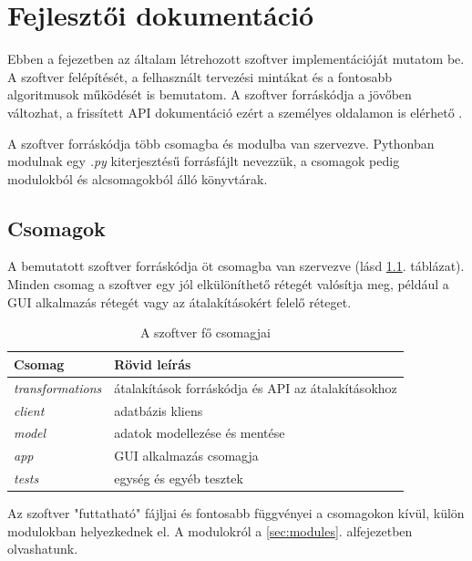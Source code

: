 \chapter{Fejlesztői dokumentáció}
\label{ch:impl}

Ebben a fejezetben az általam létrehozott szoftver implementációját mutatom be.
A szoftver felépítését, a felhasznált tervezési mintákat és
a fontosabb algoritmusok működését is bemutatom.
A szoftver forráskódja a jövőben változhat,
a frissített API dokumentáció ezért a személyes oldalamon is elérhető \cite{apidoc}.

A szoftver forráskódja több csomagba és modulba van szervezve.
Pythonban modulnak egy \emph{.py} kiterjesztésű forrásfájlt nevezzük,
a csomagok pedig modulokból és alcsomagokból álló könyvtárak.

\section{Csomagok}

A bemutatott szoftver forráskódja öt csomagba van szervezve (lásd \ref{tab:packages}. táblázat).
Minden csomag a szoftver egy jól elkülöníthető rétegét valósítja meg,
például a GUI alkalmazás rétegét vagy az átalakításokért felelő réteget.

\begin{table}[H]
	\centering
	\begin{tabular}{ | m{} | m{} | }
		\hline
		\textbf{Csomag} & \textbf{Rövid leírás} \\
		\hline \hline
		\emph{transformations} & átalakítások forráskódja és API az átalakításokhoz \\
		\hline
		\emph{client} & adatbázis kliens \\
		\hline
		\emph{model} & adatok modellezése és mentése \\
		\hline
		\emph{app} & GUI alkalmazás csomagja \\
		\hline
		\emph{tests} & egység és egyéb tesztek \\
		\hline
	\end{tabular}
	\caption{A szoftver fő csomagjai}
	\label{tab:packages}
\end{table}

Az szoftver "futtatható" fájljai és fontosabb függvényei a csomagokon kívül, külön modulokban helyezkednek el.
A modulokról a \ref{sec:modules}. alfejezetben olvashatunk.

